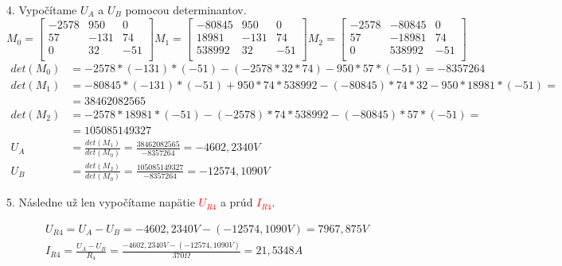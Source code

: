 \documentclass[a4paper,12pt]{article}
\begin{document}
4. Vypočítame $U_A$ a $U_B$ pomocou determinantov.
\begin{equation*}
M_0 = \begin{bmatrix}
	-2578 & 950 & 0  \\
	57 & -131 & 74  \\
	0 & 32 & -51 \\
     \end{bmatrix}
M_1 = \begin{bmatrix}
	-80845  & 950 & 0  \\
	18 981 & -131 & 74  \\
	538992 & 32 & -51 \\
     \end{bmatrix}
M_2 = \begin{bmatrix}
	-2578 &  -80845 & 0  \\
	57 & -18 981 & 74  \\
	0 & 538992 & -51 \\
     \end{bmatrix}
\end{equation*}
\begin{equation*}
   \begin{split}
	det(M_0) &= -2578 * (-131) * (-51) - (-2578*32*74) - 950*57*(-51) = - 8 357 264 \\
	det(M_1) &= -80 845 *(-131) * (-51) + 950 *74 * 538 992 - (-80 845) * 74 * 32 - 950 * 18981 * (-51) = \\
	&= 38 462 082 565 \\
	det(M_2) &= -2578 * 18981 * (-51) - (-2578) * 74 * 538992 - (-80845) * 57 * (-51) =  \\
	&= 105085149327 \\
	U_A &= \frac{det(M_1)}{det(M_0)}= \frac{38 462 082 565}{ - 8 357 264}= -4602,2340V \\
	U_B &= \frac{det(M_2)}{det(M_0)}= \frac{105085149327}{ - 8 357 264}=   -12574,1090V 
   \end{split}
\end{equation*}

5. Následne už len vypočítame  napätie 
\textcolor{red}{$U_{R4}$}
a prúd
\textcolor{red}{$I_{R4}$}.

\begin{equation*}
   \begin{split}
	U_{R4} = U_A - U_B = -4602,2340V  - (-12574,1090V ) = 7 967,875V \\
	I_{R4} = \frac{U_A-U_B}{R_4} = \frac{-4602,2340V  - (-12574,1090V )}{370\Omega} = 21,5348A
   \end{split}
\end{equation*}
\end{document}
